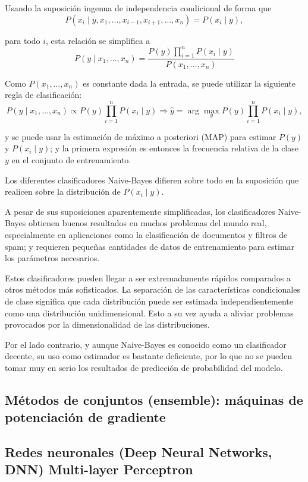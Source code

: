 Usando la suposición ingenua de independencia condicional de forma que
\begin{equation*}
    P(x_{i} \mid y,x_{1},\dots,x_{i-1},x_{i+1},\dots,x_{n})=P(x_{i}\mid y),
\end{equation*}

para todo $i$, esta relación se simplifica a 
\begin{equation*}
    P(y\mid x_{1},\dots,x_{n})=\dfrac{P(y) \prod^{n}_{i=1} P(x_{i}\mid y)}{P(x_{1},\dots,x_{n})}
\end{equation*}

Como $P(x_{1},\dots,x_{n})$ es constante dada la entrada, se puede utilizar la siguiente regla de clasificación:
\begin{equation*}
    P(y\mid x_{1},\dots,x_{n}) \propto P(y) \prod^{n}_{i=1}P(x_{i}\mid y) \Rightarrow 
    \hat{y} = \arg \max_{y} P(y) \prod^{n}_{i=1}P(x_{i}\mid y),
\end{equation*}

y se puede usar la estimación de máximo a posteriori (MAP) para estimar $P(y)$ y $P(x_{i}\mid y)$; y la primera expresión es entonces la frecuencia relativa de la clase $y$ en el conjunto de entrenamiento.

Los diferentes clasificadores Naive-Bayes difieren sobre todo en la suposición que realicen sobre la distribución de $P(x_{i} \mid y)$.

A pesar de sus suposiciones aparentemente simplificadas, 
los clasificadores Naive-Bayes obtienen buenos resultados en muchos problemas del mundo real, 
especialmente en aplicaciones como la clasificación de documentos y filtros de spam;
y requieren pequeñas cantidades de datos de entrenamiento para estimar los parámetros necesarios.

Estos clasificadores pueden llegar a ser extremadamente rápidos comparados a otros métodos más sofisticados. La separación de las características condicionales de clase significa que cada distribución puede ser estimada independientemente como una distribución unidimensional.
Esto a su vez ayuda a aliviar problemas provocados por la dimensionalidad de las distribuciones.

Por el lado contrario, y aunque Naive-Bayes es conocido como un clasificador decente, su uso como estimador es bastante deficiente, por lo que no se pueden tomar muy en serio los resultados de predicción de probabilidad del modelo.

\subsection{Métodos de conjuntos (ensemble): máquinas de potenciación de gradiente}
\subsection{Redes neuronales (Deep Neural Networks, DNN) Multi-layer Perceptron}

